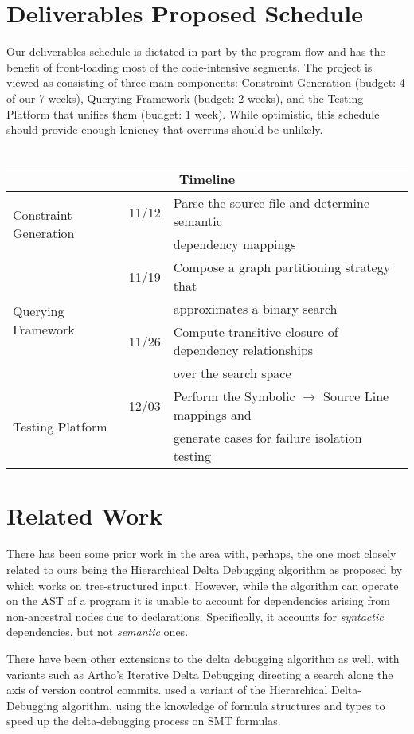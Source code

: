 \documentclass[11pt]{article}
\begin{document}
\section{Deliverables Proposed Schedule}
Our deliverables schedule is dictated in part by the program flow and has the
benefit of front-loading most of the code-intensive segments. The project is
viewed as consisting of three main components: Constraint Generation (budget: 4
of our 7 weeks), Querying Framework (budget: 2 weeks), and the Testing Platform
that unifies them (budget: 1 week). While optimistic, this schedule should
provide enough leniency that overruns should be unlikely.  \\ \\
\begin{tabular}{|l|l|l|}
\hline
\multicolumn{3}{|c|}{Timeline} \\
\hline
\multirow{2}{*}{Constraint Generation} & 11/12 &
Parse the source file and determine semantic \\
 & & dependency mappings \\ \hline
\multirow{4}{*}{Querying Framework} & 11/19 & Compose a graph partitioning
strategy that \\
 & & approximates a binary search \\
 & 11/26 & Compute transitive closure of dependency relationships \\
 & & over the search space \\ \hline
\multirow{2}{*}{Testing Platform} & 12/03 & Perform the Symbolic $\rightarrow$
Source Line mappings and \\
 & & generate cases for failure isolation testing \\ \hline
\end{tabular}



\section{Related Work}
There has been some prior work in the area with, perhaps, the one most closely
related to ours being the Hierarchical Delta Debugging algorithm as proposed by
\citet{hdd} which works on tree-structured input. However, while
the algorithm can operate on the AST of a program it is unable to account for
dependencies arising from non-ancestral nodes due to declarations. Specifically,
it accounts for \emph{syntactic} dependencies, but not \emph{semantic} ones.

There have been other extensions to the delta debugging algorithm as well, with
variants such as Artho's Iterative Delta Debugging \citep{idd} directing a search
along the axis of version control commits. \citet{smt} used a
variant of the Hierarchical Delta-Debugging algorithm, using the knowledge of
formula structures and types to speed up the delta-debugging process on SMT
formulas.
\end{document}
